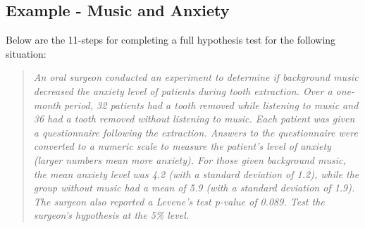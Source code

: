 \documentclass[10pt,openany]{book}\usepackage[]{graphicx}\usepackage[]{color}
\begin{document}
\vspace*{12pt}
\subsection{Example - Music and Anxiety}
Below are the 11-steps  for completing a full hypothesis test for the following situation:
\vspace{-4pt}
\begin{quote}
\textsl{An oral surgeon conducted an experiment to determine if background music decreased the anxiety level of patients during tooth extraction. Over a one-month period, 32 patients had a tooth removed while listening to music and 36 had a tooth removed without listening to music. Each patient was given a questionnaire following the extraction. Answers to the questionnaire were converted to a numeric scale to measure the patient's level of anxiety (larger numbers mean more anxiety). For those given background music, the mean anxiety level was 4.2 (with a standard deviation of 1.2), while the group without music had a mean of 5.9 (with a standard deviation of 1.9). The surgeon also reported a Levene's test p-value of 0.089. Test the surgeon's hypothesis at the 5\% level.}
\end{quote}
\end{document}
